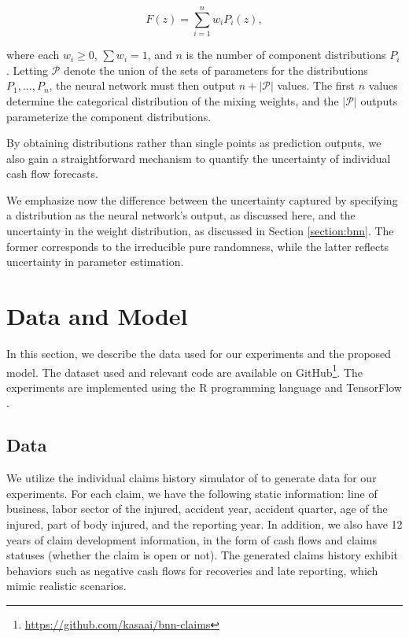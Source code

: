 \documentclass{article}
\begin{document}
\begin{equation}
    F(z) = \sum_{i = 1}^n w_i P_i(z),
\end{equation}

where each $w_i \geq 0$, $\sum w_i = 1$, and $n$ is the number of component 
distributions $P_i$. Letting $\mathcal{P}$ denote the union of the sets of 
parameters for the distributions $P_1, \dots, P_n$, the neural network must then
output $n + |\mathcal{P}|$ values. The first $n$ values determine the 
categorical distribution of the mixing weights, and the $|\mathcal{P}|$ outputs
parameterize the component distributions.

By obtaining distributions rather than single points as prediction outputs, we
also gain a straightforward mechanism to quantify the uncertainty of individual
cash flow forecasts.

We emphasize now the difference between the uncertainty captured by specifying a
distribution as the neural network's output, as discussed here, and the 
uncertainty in the weight distribution, as discussed in Section 
\ref{section:bnn}. The former corresponds to the irreducible pure randomness,
while the latter reflects uncertainty in parameter estimation.

\section{Data and Model}

In this section, we describe the data used for our experiments and the proposed
model. The dataset used and relevant code are available on 
GitHub\footnote{\url{https://github.com/kasaai/bnn-claims}}. The experiments are
implemented using the R programming language 
\cite{rdevelopmentcoreteamLanguageEnvironment2011} and TensorFlow 
\cite{abadiTensorflowSystem2016}.

\subsection{Data}

We utilize the individual claims history simulator of 
\cite{gabrielliIndividualClaims2018} to generate data for our experiments. For 
each claim, we have the following static information: line of business, labor 
sector of the injured, accident year, accident quarter, age of the injured, part
of body injured, and the reporting year. In addition, we also have 12 years of 
claim development information, in the form of cash flows and claims statuses 
(whether the claim is open or not). The generated claims history exhibit 
behaviors such as negative cash flows for recoveries and late reporting, which 
mimic realistic scenarios.
\end{document}
